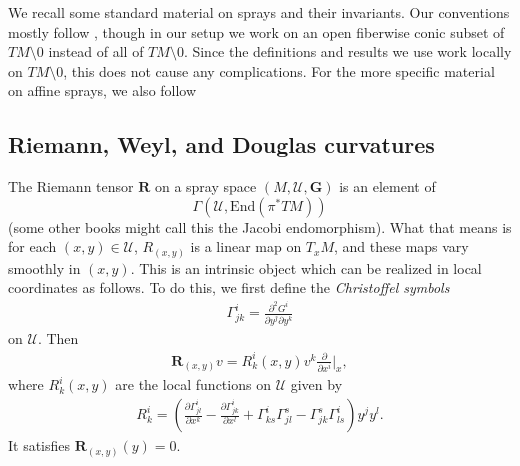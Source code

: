 \documentclass{article}
\newcommand{\bG}{\mathbf{G}}
\numberwithin{equation}{section}
\theoremstyle{plain}
\begin{document}
We recall some standard material on sprays and their invariants. Our conventions mostly follow \cite{Shen01}, though in our setup we work on an open fiberwise conic subset of $TM \setminus 0$ instead of all of $TM \setminus 0$. Since the definitions and results we use work locally on $TM \setminus 0$, this does not cause any complications. For the more specific material on affine sprays, we also follow \cite[Chapter 1.3]{affDiffGeoKatsumi}

\subsection{Riemann, Weyl, and Douglas curvatures}

 The Riemann tensor $\mathbf R$ on a spray space $(M, \mathcal U, \bG)$ is an element of 
 \begin{equation}
 \Gamma(\mathcal U, \mathrm{End}(\pi^* TM))
 \end{equation}
  (some other books might call this the Jacobi endomorphism). What that means is for each $(x,y) \in \mathcal U$, $R_{(x,y)}$ is a linear map on $T_x M$, and these maps vary smoothly in $(x,y)$. 
This is an intrinsic object which can be realized in local coordinates as follows. To do this, we first define the \emph{Christoffel symbols}
\begin{align}
    \Gamma_{jk}^i = \frac{\partial^2 G^i}{\partial y^j \partial y^k}
\end{align}
on $\mathcal U$. Then 
\begin{align}
    \mathbf{R}_{(x,y)}v = R_k^i(x,y)v^k \frac{\partial}{\partial x^i} |_x,   
\end{align}
where $R_k^i(x,y)$ are the local functions on $\mathcal U$ given by 
\begin{align}
    R_k^i = (\frac{\partial \Gamma_{jl}^i}{\partial x^k} - \frac{\partial \Gamma^i_{jk}}{\partial x^l} + \Gamma_{ks}^i \Gamma_{jl}^s - \Gamma_{jk}^s \Gamma_{ls}^i) y^j y^l.
\end{align}
It satisfies $\mathbf{R}_{(x,y)}(y) =0$. \\
\end{document}
